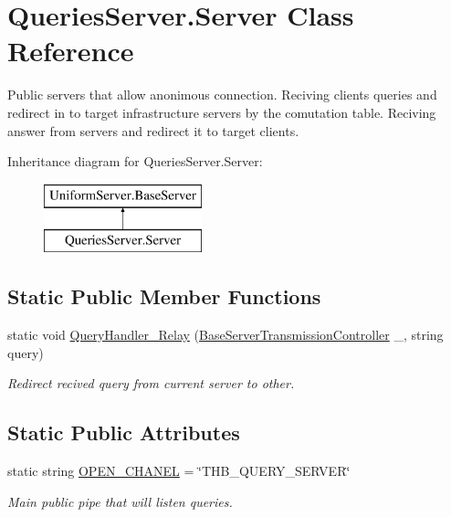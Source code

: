 \hypertarget{class_queries_server_1_1_server}{}\section{Queries\+Server.\+Server Class Reference}
\label{class_queries_server_1_1_server}


Public servers that allow anonimous connection. Reciving clients\textquotesingle{} queries and redirect in to target infrastructure servers by the comutation table. Reciving answer from servers and redirect it to target clients.  


Inheritance diagram for Queries\+Server.\+Server\+:\begin{figure}[H]
\begin{center}
\leavevmode
\includegraphics[height=2.000000cm]{d2/d9a/class_queries_server_1_1_server}
\end{center}
\end{figure}
\subsection*{Static Public Member Functions}
\begin{DoxyCompactItemize}
\item 
static void \mbox{\hyperlink{class_queries_server_1_1_server_af23657bf1fbf254abb46ed80180b0cc3}{Query\+Handler\+\_\+\+Relay}} (\mbox{\hyperlink{class_pipes_provider_1_1_server_1_1_transmission_controllers_1_1_base_server_transmission_controller}{Base\+Server\+Transmission\+Controller}} \+\_\+, string query)
\begin{DoxyCompactList}\small\item\em Redirect recived query from current server to other. \end{DoxyCompactList}\end{DoxyCompactItemize}
\subsection*{Static Public Attributes}
\begin{DoxyCompactItemize}
\item 
static string \mbox{\hyperlink{class_queries_server_1_1_server_a5d7c4c9ababa7292ef7cac92005d3563}{O\+P\+E\+N\+\_\+\+C\+H\+A\+N\+EL}} = \char`\"{}T\+H\+B\+\_\+\+Q\+U\+E\+R\+Y\+\_\+\+S\+E\+R\+V\+ER\char`\"{}
\begin{DoxyCompactList}\small\item\em Main public pipe that will listen queries. \end{DoxyCompactList}\end{DoxyCompactItemize}
